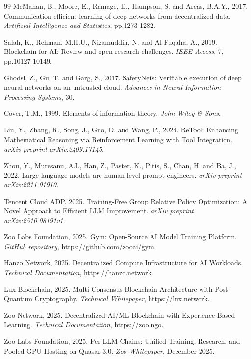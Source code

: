 \begin{thebibliography}{99}
McMahan, B., Moore, E., Ramage, D., Hampson, S. and Arcas, B.A.Y., 2017. Communication-efficient learning of deep networks from decentralized data. \textit{Artificial Intelligence and Statistics}, pp.1273-1282.

Salah, K., Rehman, M.H.U., Nizamuddin, N. and Al-Fuqaha, A., 2019. Blockchain for AI: Review and open research challenges. \textit{IEEE Access}, 7, pp.10127-10149.

Ghodsi, Z., Gu, T. and Garg, S., 2017. SafetyNets: Verifiable execution of deep neural networks on an untrusted cloud. \textit{Advances in Neural Information Processing Systems}, 30.

Cover, T.M., 1999. Elements of information theory. \textit{John Wiley \& Sons}.

Liu, Y., Zhang, R., Song, J., Guo, D. and Wang, P., 2024. ReTool: Enhancing Mathematical Reasoning via Reinforcement Learning with Tool Integration. \textit{arXiv preprint arXiv:2409.17145}.

Zhou, Y., Muresanu, A.I., Han, Z., Paster, K., Pitis, S., Chan, H. and Ba, J., 2022. Large language models are human-level prompt engineers. \textit{arXiv preprint arXiv:2211.01910}.

Tencent Cloud ADP, 2025. Training-Free Group Relative Policy Optimization: A Novel Approach to Efficient LLM Improvement. \textit{arXiv preprint arXiv:2510.08191v1}.

Zoo Labs Foundation, 2025. Gym: Open-Source AI Model Training Platform. \textit{GitHub repository}, \url{https://github.com/zooai/gym}.

Hanzo Network, 2025. Decentralized Compute Infrastructure for AI Workloads. \textit{Technical Documentation}, \url{https://hanzo.network}.

Lux Blockchain, 2025. Multi-Consensus Blockchain Architecture with Post-Quantum Cryptography. \textit{Technical Whitepaper}, \url{https://lux.network}.

Zoo Network, 2025. Decentralized AI/ML Blockchain with Experience-Based Learning. \textit{Technical Documentation}, \url{https://zoo.ngo}.

Zoo Labs Foundation, 2025. Per-LLM Chains: Unified Training, Research, and Pooled GPU Hosting on Quasar 3.0. \textit{Zoo Whitepaper}, December 2025.


\end{thebibliography}
